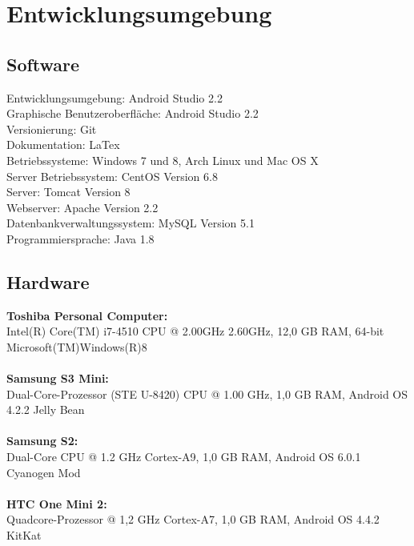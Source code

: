 \section{Entwicklungsumgebung}

\subsection{Software}
Entwicklungsumgebung: 				Android Studio 2.2\\
Graphische Benutzeroberfläche: 		Android Studio 2.2\\
Versionierung: 						Git\\
Dokumentation:						LaTex\\
Betriebssysteme: 					Windows 7 und 8, Arch Linux und Mac OS X\\
Server Betriebssystem:				CentOS Version 6.8\\
Server:								Tomcat Version 8\\
Webserver:							Apache Version 2.2\\
Datenbankverwaltungssystem: 		MySQL Version 5.1\\
Programmiersprache:					Java 1.8\\

\subsection{Hardware}

\textbf{Toshiba Personal Computer:}\\	
Intel(R) Core(TM) i7-4510 CPU @ 2.00GHz 2.60GHz,
12,0 GB RAM,
64-bit Microsoft(TM)Windows(R)8\\
\\
\textbf{Samsung S3 Mini:} \\		
Dual-Core-Prozessor (STE U-8420) CPU @ 1.00 GHz,
1,0 GB RAM,
Android OS 4.2.2 Jelly Bean\\
\\
\textbf{Samsung S2:} \\                       
Dual-Core CPU @ 1.2 GHz Cortex-A9,
1,0 GB RAM,
Android OS 6.0.1 Cyanogen Mod\\
\\                                  
\textbf{HTC One Mini 2:}\\						
Quadcore-Prozessor @ 1,2 GHz Cortex-A7,
1,0 GB RAM,
Android OS 4.4.2 KitKat\\                                  
